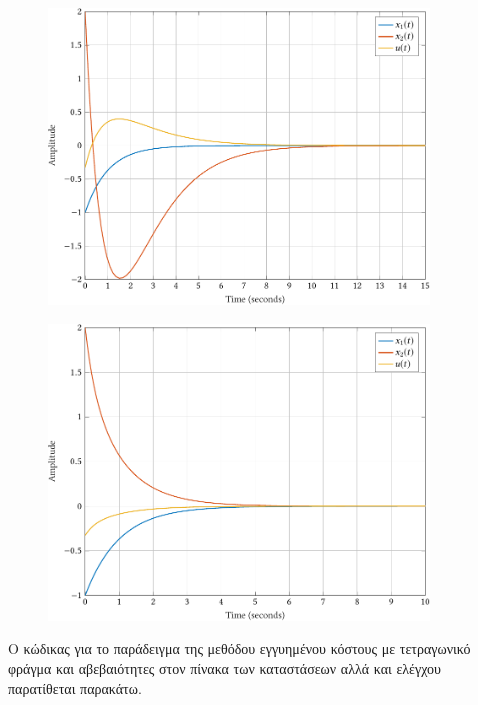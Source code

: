 \begin{figure}[h]
    \centering
    \includegraphics[width=0.9\textwidth]{figures/gcc_quad_bound2.pdf}
    \label{fig:gcc_quad_bound2}
\end{figure}
\begin{figure}[h]
    \centering
    \includegraphics[width=0.9\textwidth]{figures/gcc_quad_bound3.pdf}
    \label{fig:gcc_quad_bound3}
\end{figure}

Ο κώδικας για το παράδειγμα της μεθόδου εγγυημένου κόστους με τετραγωνικό φράγμα
και αβεβαιότητες στον πίνακα των καταστάσεων αλλά και ελέγχου παρατίθεται παρακάτω.
\eng{}

